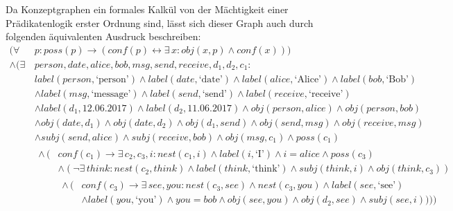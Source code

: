 \documentclass[11pt, a4paper]{scrreprt}
\begin{document}
Da Konzeptgraphen ein formales Kalkül von der Mächtigkeit einer Prädikatenlogik erster Ordnung sind, lässt sich dieser Graph auch durch folgenden äquivalenten Ausdruck beschreiben:
\begin{align*}
	(\forall\,& p: poss(p) \rightarrow (conf(p) \leftrightarrow \exists\, x: obj(x, p) \land conf(x)))\\
	\land (\exists\,& person, date, alice, bob, msg, send, receive, d_1, d_2, c_1:\\
	& label(person, \text{`person'}) \land label(date, \text{`date'}) \land label(alice, \text{`Alice'}) \land label(bob, \text{`Bob'})\\
	& \land label(msg, \text{`message'}) \land label(send, \text{`send'}) \land label(receive, \text{`receive'})\\
	& \land label(d_1, 12.06.2017) \land label(d_2, 11.06.2017) \land obj(person, alice) \land obj(person, bob)\\
	& \land obj(date, d_1) \land obj(date, d_2) \land obj(d_1, send) \land obj(send, msg) \land obj(receive, msg)\\
	& \land subj(send, alice) \land subj(receive, bob) \land obj(msg, c_1) \land poss(c_1)\\
	& \begin{aligned}
		\land\, (&conf(c_1) \rightarrow \exists\, c_2, c_3, i: nest(c_1, i) \land label(i, \text{`I'}) \land i = alice \land poss(c_3)\\
		& \land (\lnot\exists\, think: nest(c_2, think) \land label(think, \text{`think'}) \land subj(think, i) \land obj(think, c_3))\\
		& \begin{aligned}
			\land\, (&conf(c_3) \rightarrow \exists\, see, you: nest(c_3, see) \land nest(c_3, you) \land label(see, \text{`see'})\\
			& \land label(you, \text{`you'}) \land you = bob \land obj(see, you) \land obj(d_2, see) \land subj(see, i))))
		\end{aligned}
	\end{aligned}
\end{align*}
\end{document}
